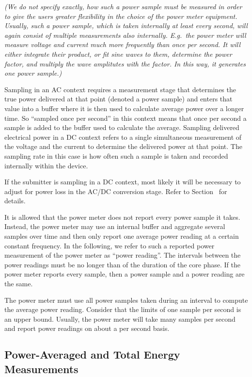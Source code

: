 \noindent
\textit{(We do not specify exactly, how such a power sample must be measured in order to give the users greater flexibility in the choice of the power meter equipment.
Usually, such a power sample, which is taken internally at least every second, will again consist of multiple measurements also internally.
E.g.~the power meter will measure voltage and current much more frequently than once per second.
It will either integrate their product, or fit sine waves to them, determine the power factor, and multiply the wave amplitutes with the factor.
In this way, it generates one power sample.)}
\wl

\noindent
Sampling in an AC context requires a measurement stage that determines the true power delivered at that point (denoted a power sample) and enters that value into a buffer where it is then used to calculate average power over a longer time.
So ``sampled once per second'' in this context means that once per second a sample is added to the buffer used to calculate the average.
Sampling delivered electrical power in a DC context refers to a single simultaneous measurement of the voltage and the current to determine the delivered power at that point.
The sampling rate in this case is how often such a sample is taken and recorded internally within the device.
\wl

\noindent
If the submitter is sampling in a DC context, most likely it will be necessary to adjust for power loss in the AC/DC conversion stage.
Refer to Section~ for details.
\wl

\noindent
It is allowed that the power meter does not report every power sample it takes.
Instead, the power meter may use an internal buffer and aggregate several samples over time and then only report one average power reading at a certain constant frequency.
In the following, we refer to such a reported power measurement of the power meter as ``power reading''.
The intervals between the power readings must be no longer than \MaxReadingIntervalCorePhaseLTwoThree{} of the duration of the core phase.
If the power meter reports every sample, then a power sample and a power reading are the same.
\wl

\noindent
The power meter must use all power samples taken during an interval to compute the average power reading.
Consider that the limits of one sample per second is an upper bound.
Usually, the power meter will take many samples per second and report power readings on about a per second basis.

\subsection{Power-Averaged and Total Energy Measurements}
\label{sec:PAaTEM}

